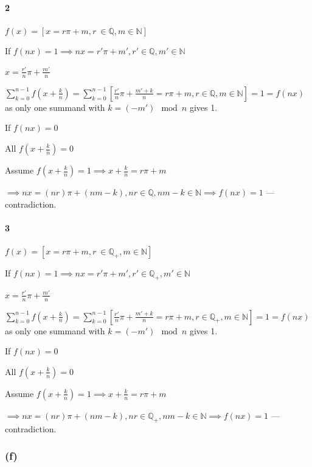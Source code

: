 \documentclass{article}
\begin{document}
\paragraph*{2}

\( f(x) = [x = r \pi + m, r\ \in \mathbb{Q}, m \in \mathbb{N}] \)

If \( f(nx) = 1 \implies nx = r' \pi + m', r' \in \mathbb{Q}, m' \in \mathbb{N} \)

\( x = \frac{r'}{n} \pi + \frac{m'}{n} \)

\( \sum_{k=0}^{n-1} f(x+\frac{k}{n}) = \sum_{k=0}^{n-1} [\frac{r'}{n} \pi + \frac{m'+k}{n} = r\pi + m, r \in \mathbb{Q}, m \in \mathbb{N}] = 1 = f(nx) \) as only one summand with \( k = (-m') \mod n \) gives 1.

If \( f(nx) = 0 \)

All \( f(x+\frac{k}{n}) = 0 \)

Assume \( f(x+\frac{k}{n}) = 1 \implies x + \frac{k}{n} = r\pi + m \)

\( \implies nx = (nr)\pi + (nm - k), nr \in \mathbb{Q}, nm - k \in \mathbb{N} \implies f(nx) = 1 \) --- contradiction.

\paragraph*{3}

\( f(x) = [x = r \pi + m, r\ \in \mathbb{Q_+}, m \in \mathbb{N}] \)

If \( f(nx) = 1 \implies nx = r' \pi + m', r' \in \mathbb{Q_+}, m' \in \mathbb{N} \)

\( x = \frac{r'}{n} \pi + \frac{m'}{n} \)

\( \sum_{k=0}^{n-1} f(x+\frac{k}{n}) = \sum_{k=0}^{n-1} [\frac{r'}{n} \pi + \frac{m'+k}{n} = r\pi + m, r \in \mathbb{Q_+}, m \in \mathbb{N}] = 1 = f(nx) \) as only one summand with \( k = (-m') \mod n \) gives 1.

If \( f(nx) = 0 \)

All \( f(x+\frac{k}{n}) = 0 \)

Assume \( f(x+\frac{k}{n}) = 1 \implies x + \frac{k}{n} = r\pi + m \)

\( \implies nx = (nr)\pi + (nm - k), nr \in \mathbb{Q_+}, nm - k \in \mathbb{N} \implies f(nx) = 1 \) --- contradiction.

\subsubsection*{(f)}
\end{document}
